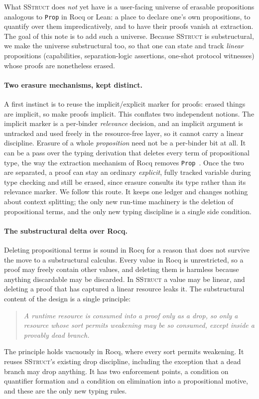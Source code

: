 \documentclass[11pt]{article}
\theoremstyle{definition}
\theoremstyle{plain}
\begin{document}
What \textsc{SStruct} does \emph{not} yet have is a user-facing universe of
erasable propositions analogous to \texttt{Prop} in Rocq or Lean: a place to
declare one's own propositions, to quantify over them impredicatively, and to
have their proofs vanish at extraction. The goal of this note is to add such a
universe. Because \textsc{SStruct} is substructural, we make the universe
substructural too, so that one can state and track \emph{linear} propositions
(capabilities, separation-logic assertions, one-shot protocol witnesses) whose
proofs are nonetheless erased.

\paragraph{Two erasure mechanisms, kept distinct.}
A first instinct is to reuse the implicit/explicit marker for proofs: erased
things are implicit, so make proofs implicit. This conflates two independent
notions. The implicit marker is a per-binder \emph{relevance} decision, and an
implicit argument is untracked and used freely in the resource-free layer, so it
cannot carry a linear discipline. Erasure of a whole \emph{proposition} need not
be a per-binder bit at all. It can be a pass over the typing derivation that
deletes every term of propositional type, the way the extraction mechanism of
Rocq removes \texttt{Prop}~\cite{letouzey}. Once the two are separated, a proof
can stay an ordinary \emph{explicit}, fully tracked variable during type checking
and still be erased, since erasure consults its type rather than its relevance
marker. We follow this route. It keeps one ledger and changes nothing about
context splitting; the only new run-time machinery is the deletion of
propositional terms, and the only new typing discipline is a single side
condition.

\paragraph{The substructural delta over Rocq.}
Deleting propositional terms is sound in Rocq for a reason that does not survive
the move to a substructural calculus. Every value in Rocq is unrestricted, so a
proof may freely contain other values, and deleting them is harmless because
anything discardable may be discarded. In \textsc{SStruct} a value may be linear,
and deleting a proof that has captured a linear resource leaks it. The
substructural content of the design is a single principle:
\begin{quote}
\emph{A runtime resource is consumed into a proof only as a drop, so only a
resource whose sort permits weakening may be so consumed, except inside a
provably dead branch.}
\end{quote}
The principle holds vacuously in Rocq, where every sort permits weakening. It
reuses \textsc{SStruct}'s existing drop discipline, including the exception that a
dead branch may drop anything. It has two enforcement points, a condition on
quantifier formation and a condition on elimination into a propositional motive,
and these are the only new typing rules.
\end{document}
